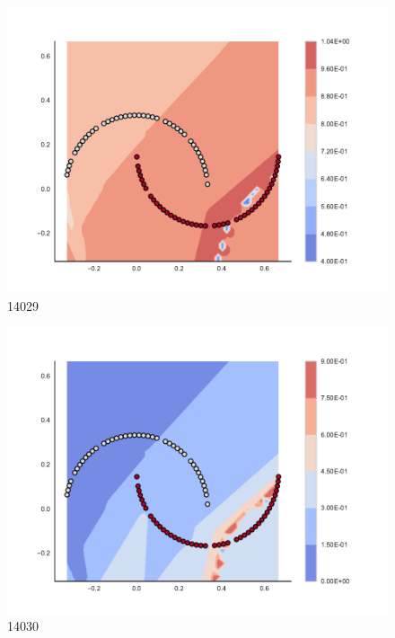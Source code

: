 \begin{subfigure}[b]{0.09\textwidth}
    \includegraphics[clip, trim=2.35cm 1.75cm 4.5cm 0cm,width=\textwidth]{img/convergence/14029.pdf}
    \caption{14029}
    \label{fig:convergence_14029}
\end{subfigure}
%
\begin{subfigure}[b]{0.09\textwidth}
    \includegraphics[clip, trim=2.35cm 1.75cm 4.5cm 0cm,width=\textwidth]{img/convergence/14030.pdf}
    \caption{14030}
    \label{fig:convergence_14030}
\end{subfigure}
%
